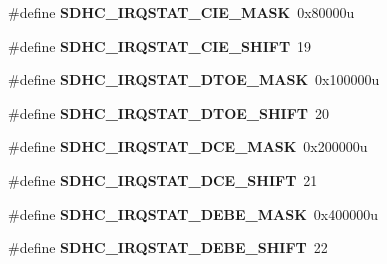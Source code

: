 \begin{DoxyCompactItemize}
\item 
\#define {\bfseries S\+D\+H\+C\+\_\+\+I\+R\+Q\+S\+T\+A\+T\+\_\+\+C\+I\+E\+\_\+\+M\+A\+SK}~0x80000u\hypertarget{group__SDHC__Register__Masks_gaee0c763af3fc323b0f3c35f3ad988e37}{}\label{group__SDHC__Register__Masks_gaee0c763af3fc323b0f3c35f3ad988e37}

\item 
\#define {\bfseries S\+D\+H\+C\+\_\+\+I\+R\+Q\+S\+T\+A\+T\+\_\+\+C\+I\+E\+\_\+\+S\+H\+I\+FT}~19\hypertarget{group__SDHC__Register__Masks_ga485d7f9c01d7b3188cdcaaf94c556707}{}\label{group__SDHC__Register__Masks_ga485d7f9c01d7b3188cdcaaf94c556707}

\item 
\#define {\bfseries S\+D\+H\+C\+\_\+\+I\+R\+Q\+S\+T\+A\+T\+\_\+\+D\+T\+O\+E\+\_\+\+M\+A\+SK}~0x100000u\hypertarget{group__SDHC__Register__Masks_ga1ddb5beb552cdc6193ebf649a9279bf9}{}\label{group__SDHC__Register__Masks_ga1ddb5beb552cdc6193ebf649a9279bf9}

\item 
\#define {\bfseries S\+D\+H\+C\+\_\+\+I\+R\+Q\+S\+T\+A\+T\+\_\+\+D\+T\+O\+E\+\_\+\+S\+H\+I\+FT}~20\hypertarget{group__SDHC__Register__Masks_gac0dd3b95df6da3006bb082622a655b37}{}\label{group__SDHC__Register__Masks_gac0dd3b95df6da3006bb082622a655b37}

\item 
\#define {\bfseries S\+D\+H\+C\+\_\+\+I\+R\+Q\+S\+T\+A\+T\+\_\+\+D\+C\+E\+\_\+\+M\+A\+SK}~0x200000u\hypertarget{group__SDHC__Register__Masks_ga48e68fbecd65304dfca83a00e76f03f2}{}\label{group__SDHC__Register__Masks_ga48e68fbecd65304dfca83a00e76f03f2}

\item 
\#define {\bfseries S\+D\+H\+C\+\_\+\+I\+R\+Q\+S\+T\+A\+T\+\_\+\+D\+C\+E\+\_\+\+S\+H\+I\+FT}~21\hypertarget{group__SDHC__Register__Masks_ga76f0e02634ba99e8b7dd3db03d6e9dc6}{}\label{group__SDHC__Register__Masks_ga76f0e02634ba99e8b7dd3db03d6e9dc6}

\item 
\#define {\bfseries S\+D\+H\+C\+\_\+\+I\+R\+Q\+S\+T\+A\+T\+\_\+\+D\+E\+B\+E\+\_\+\+M\+A\+SK}~0x400000u\hypertarget{group__SDHC__Register__Masks_gaff8f0d4c189f99dc324251e1c1486414}{}\label{group__SDHC__Register__Masks_gaff8f0d4c189f99dc324251e1c1486414}

\item 
\#define {\bfseries S\+D\+H\+C\+\_\+\+I\+R\+Q\+S\+T\+A\+T\+\_\+\+D\+E\+B\+E\+\_\+\+S\+H\+I\+FT}~22\hypertarget{group__SDHC__Register__Masks_gaca30553c1983afb6604acc0468a3a7b9}{}\label{group__SDHC__Register__Masks_gaca30553c1983afb6604acc0468a3a7b9}


\end{DoxyCompactItemize}

